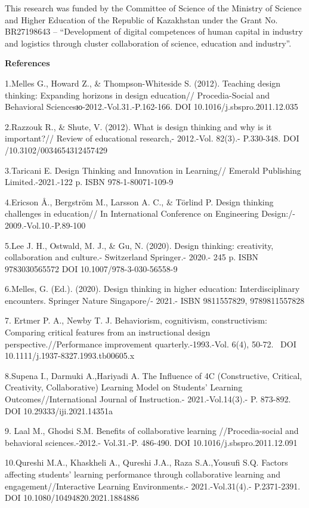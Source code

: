 This research was funded by the Committee of Science of the Ministry of
Science and Higher Education of the Republic of Kazakhstan under the
Grant No. BR27198643 -- ``Development of digital competences of human
capital in industry and logistics through cluster collaboration of
science, education and industry''.

{\bfseries References}

1.Melles G., Howard Z., \& Thompson-Whiteside S. (2012). Teaching design
thinking: Expanding horizons in design education// Procedia-Social and
Behavioral Sciencesю-2012.-Vol.31.-P.162-166. DOI
10.1016/j.sbspro.2011.12.035

2.Razzouk R., \& Shute, V. (2012). What is design thinking and why is it
important?// Review of educational research,- 2012.-Vol. 82(3).-
P.330-348. DOI /10.3102/0034654312457429

3.Taricani E. Design Thinking and Innovation in Learning// Emerald
Publishing Limited.-2021.-122 p. ISBN 978-1-80071-109-9

4.Ericson Å., Bergström M., Larsson A. C., \& Törlind P. Design thinking
challenges in education// In International Conference on Engineering
Design:/- 2009.-Vol.10.-P.89-100

5.Lee J. H., Ostwald, M. J., \& Gu, N. (2020). Design thinking:
creativity, collaboration and culture.- Switzerland Springer.- 2020.-
245 p. ISBN 9783030565572 DOI 10.1007/978-3-030-56558-9

6.Melles, G. (Ed.). (2020). Design thinking in higher education:
Interdisciplinary encounters. Springer Nature Singapore/- 2021.- ISBN
9811557829, 9789811557828

7. Ertmer P. A., Newby T. J. Behaviorism, cognitivism, constructivism:
Comparing critical features from an instructional design
perspective.//Performance improvement quarterly.-1993.-Vol. 6(4), 50-72.
~DOI 10.1111/j.1937-8327.1993.tb00605.x

8.Supena I., Darmuki A.,Hariyadi A. The Influence of 4C (Constructive,
Critical, Creativity, Collaborative) Learning Model on
Students'{} Learning Outcomes//International Journal of
Instruction.- 2021.-Vol.14(3).- P. 873-892. DOI 10.29333/iji.2021.14351a

9. Laal M., Ghodsi S.M. Benefits of collaborative learning
//Procedia-social and behavioral sciences.-2012.- Vol.31.-P. 486-490.
DOI 10.1016/j.sbspro.2011.12.091

10.Qureshi M.A., Khaskheli A., Qureshi J.A., Raza S.A.,Yousufi S.Q.
Factors affecting students' learning performance through collaborative
learning and engagement//Interactive Learning Environments.-
2021.-Vol.31(4).- P.2371-2391. DOI 10.1080/10494820.2021.1884886

